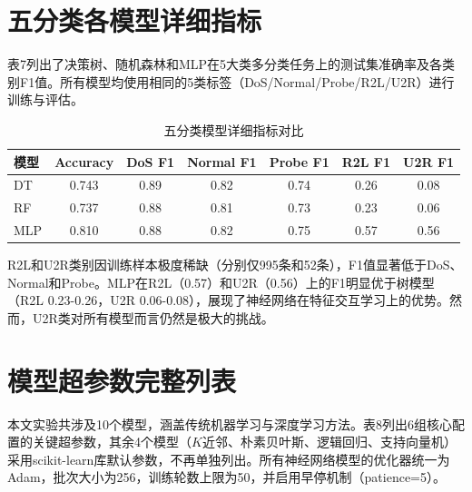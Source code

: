 
\section{五分类各模型详细指标}

表7列出了决策树、随机森林和MLP在5大类多分类任务上的测试集准确率及各类别F1值。所有模型均使用相同的5类标签（DoS/Normal/Probe/R2L/U2R）进行训练与评估。

\begin{table}[htbp]
\centering
\caption{五分类模型详细指标对比}
\label{tab:multiclass-detail}
\small
\begin{tabular}{lcccccc}
\toprule
模型 & Accuracy & DoS F1 & Normal F1 & Probe F1 & R2L F1 & U2R F1 \\
\midrule
DT  & 0.743 & 0.89 & 0.82 & 0.74 & 0.26 & 0.08 \\
RF  & 0.737 & 0.88 & 0.81 & 0.73 & 0.23 & 0.06 \\
MLP & 0.810 & 0.88 & 0.82 & 0.75 & 0.57 & 0.56 \\
\bottomrule
\end{tabular}
\end{table}

R2L和U2R类别因训练样本极度稀缺（分别仅995条和52条），F1值显著低于DoS、Normal和Probe。MLP在R2L（0.57）和U2R（0.56）上的F1明显优于树模型（R2L 0.23-0.26，U2R 0.06-0.08），展现了神经网络在特征交互学习上的优势。然而，U2R类对所有模型而言仍然是极大的挑战。

\section{模型超参数完整列表}

本文实验共涉及10个模型，涵盖传统机器学习与深度学习方法。表8列出6组核心配置的关键超参数，其余4个模型（$K$近邻、朴素贝叶斯、逻辑回归、支持向量机）采用scikit-learn库默认参数，不再单独列出。所有神经网络模型的优化器统一为Adam，批次大小为256，训练轮数上限为50，并启用早停机制（patience=5）。

